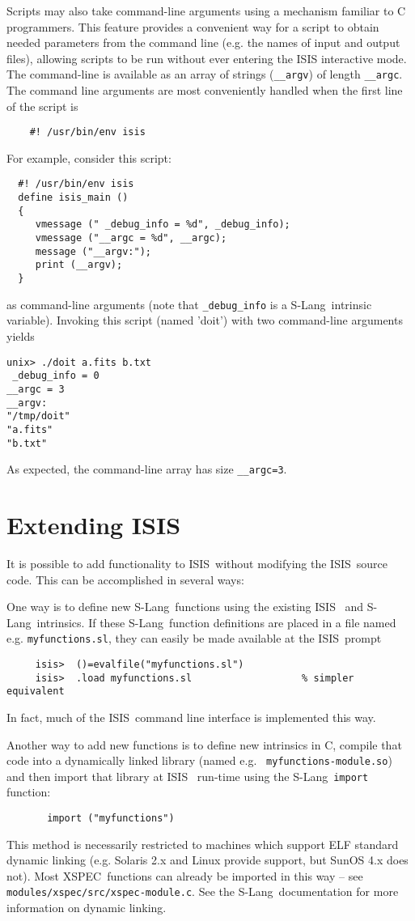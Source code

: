 \documentclass{book}
\newcommand{\isisx}{{\sc ISIS~}}
\newcommand{\slang}{{\sc S-Lang}}
\newcommand{\xspec}{{\sc XSPEC}}
\begin{document}
Scripts may also take command-line arguments using a mechanism
familiar to C programmers. This feature provides a convenient
way for a script to obtain needed parameters from the command
line (e.g. the names of input and output files), allowing
scripts to be run without ever entering the ISIS interactive
mode. The command-line is available as an array of strings
(\verb|__argv|) of length \verb|__argc|. The command line
arguments are most conveniently handled when the first line of
the script is
\begin{verbatim}
    #! /usr/bin/env isis
\end{verbatim}
For example, consider this script:
\begin{verbatim}
  #! /usr/bin/env isis
  define isis_main ()
  {
     vmessage (" _debug_info = %d", _debug_info);
     vmessage ("__argc = %d", __argc);
     message ("__argv:");
     print (__argv);
  }
\end{verbatim}
as command-line arguments (note that \verb|_debug_info| is a
\slang\ intrinsic variable).  Invoking this script (named 'doit')
with two command-line arguments yields
\begin{verbatim}
unix> ./doit a.fits b.txt
 _debug_info = 0
__argc = 3
__argv:
"/tmp/doit"
"a.fits"
"b.txt"
\end{verbatim}
As expected, the command-line array has size \verb|__argc=3|.

\section{Extending ISIS}
\label{sec:extending-isis}

It is possible to add functionality to \isisx without modifying the
\isisx source code.  This can be accomplished in several ways:

One way is to define new \slang\ functions using the existing \isisx
and \slang\ intrinsics.  If these \slang\ function definitions
are placed in a file named e.g. {\tt myfunctions.sl}, they
can easily be made available at the \isisx prompt
\begin{verbatim}
     isis>  ()=evalfile("myfunctions.sl")
     isis>  .load myfunctions.sl                   % simpler equivalent
\end{verbatim}
In fact, much of the \isisx command line interface is implemented this way.

Another way to add new functions is to define new intrinsics in C,
compile that code into a dynamically linked library (named e.g.  {\tt
myfunctions-module.so}) and then import that library at \isisx
run-time using the \slang\ {\tt import} function:
\begin{verbatim}
       import ("myfunctions")
\end{verbatim}
This method is necessarily restricted to machines which support
ELF standard dynamic linking (e.g. Solaris 2.x and Linux provide
support, but SunOS 4.x does not).  Most \xspec\ functions
can already be imported in this way -- see
\verb|modules/xspec/src/xspec-module.c|.  See the \slang\
documentation for more information on dynamic linking.
\end{document}
